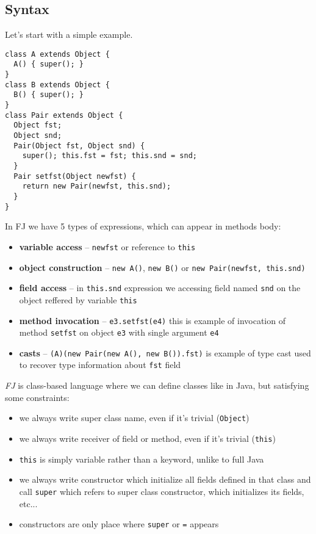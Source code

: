 \documentclass{article}[12pt]
\begin{document}
\subsection{Syntax}

Let's start with a simple example.

\begin{verbatim}
class A extends Object {
  A() { super(); }
}
class B extends Object {
  B() { super(); }
}
class Pair extends Object {
  Object fst;
  Object snd;
  Pair(Object fst, Object snd) {
    super(); this.fst = fst; this.snd = snd;
  }
  Pair setfst(Object newfst) {
    return new Pair(newfst, this.snd);
  }
}
\end{verbatim}
In FJ we have 5 types of expressions, which can appear in methods body:

\begin{itemize}
\item{\textbf{variable access}} -- \texttt{newfst} or reference to
  \texttt{this}
\item{\textbf{object construction}} -- \texttt{new A()},
  \texttt{new B()} or \texttt{new Pair(newfst, this.snd)}
\item{\textbf{field access}} -- in \texttt{this.snd} expression we
  accessing field named \texttt{snd} on the object reffered by
  variable \texttt{this}
\item{\textbf{method invocation}} -- \texttt{e3.setfst(e4)} this
  is example of invocation of method \texttt{setfst} on object
  \texttt{e3} with single argument \texttt{e4}
\item{\textbf{casts}} -- \texttt{(A)(new Pair(new A(), new B()).fst)}
  is example of type cast used to recover type information about
  \texttt{fst} field
\end{itemize}
\emph{FJ} is class-based language where we can define classes like in
Java, but satisfying some constraints:

\begin{itemize}
\item we always write super class name, even if it's trivial
  (\texttt{Object})
\item we always write receiver of field or method, even if it's
  trivial (\texttt{this})
\item \texttt{this} is simply variable rather than a keyword, unlike
  to full Java
\item we always write constructor which initialize all fields
  defined in that class and call \texttt{super} which refers to super
  class constructor, which initializes its fields, etc...
\item constructors are only place where \texttt{super} or
  \texttt{=} appears
\end{itemize}
\end{document}
